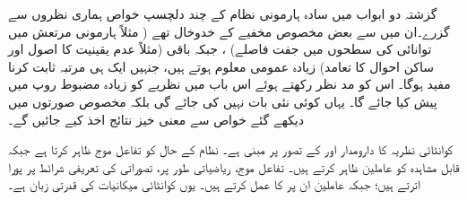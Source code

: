 
گزشتہ دو ابواب میں سادہ ہارمونی نظام کے چند دلچسپ خواص ہماری نظروں سے گزرے۔ان میں سے  بعض مخصوص مخفیے کے  خدوخال تھے ( مثلاً ہارمونی مرتعش میں توانائی کی سطحوں میں جفت فاصلے)  ، جبکہ باقی (مثلاً عدم یقینیت کا اصول اور ساکن احوال کا تعامد)  زیادہ عمومی معلوم ہوتے ہیں، جنہیں ایک ہی مرتبہ ثابت کرنا مفید ہوگا۔ اس کو مد نظر رکھتے ہوئے اس باب میں نظریے  کو زیادہ مضبوط روپ میں پیش کیا جائے گا۔ یہاں کوئی نئی بات نہیں کی جائے گی بلکہ مخصوص صورتوں میں دیکھے گئے خواص سے معنی خیز  نتائج  اخذ کیے جائیں گے۔
	
کوانٹائی نظریہ کا دارومدار اور  کے تصور پر مبنی ہے۔ نظام کے حال کو تفاعل موج ظاہر کرتا ہے جبکہ قابل مشاہدہ کو عاملین ظاہر کرتے ہیں۔ تفاعل موج، ریاضیاتی طور پر، تصوراتی  کی تعریفی شرائط پر پورا  اترتے ہیں؛ جبکہ عاملین ان پر  کا عمل کرتے ہیں۔ یوں کوانٹائی میکانیات کی قدرتی زبان  ہے۔
	
